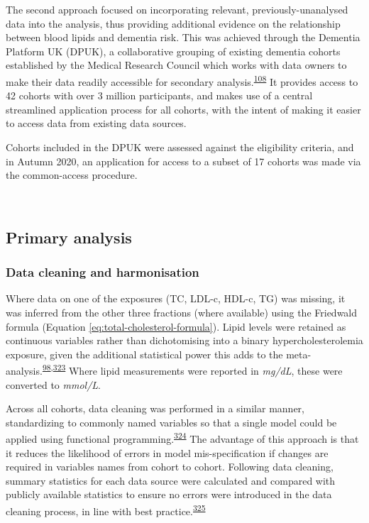 \documentclass[a4paper, twoside]{templates/ociamthesis}
\begin{document}
The second approach focused on incorporating relevant, previously-unanalysed data into the analysis, thus providing additional evidence on the relationship between blood lipids and dementia risk. This was achieved through the Dementia Platform UK (DPUK), a collaborative grouping of existing dementia cohorts established by the Medical Research Council which works with data owners to make their data readily accessible for secondary analysis.\textsuperscript{\protect\hyperlink{ref-bauermeister2020}{108}} It provides access to 42 cohorts with over 3 million participants, and makes use of a central streamlined application process for all cohorts, with the intent of making it easier to access data from existing data sources.

Cohorts included in the DPUK were assessed against the eligibility criteria, and in Autumn 2020, an application for access to a subset of 17 cohorts was made via the common-access procedure.

~

\hypertarget{primary-analysis-1}{%
\subsection{Primary analysis}\label{primary-analysis-1}}

\hypertarget{data-cleaning-and-harmonisation}{%
\subsubsection{Data cleaning and harmonisation}\label{data-cleaning-and-harmonisation}}

Where data on one of the exposures (TC, LDL-c, HDL-c, TG) was missing, it was inferred from the other three fractions (where available) using the Friedwald formula (Equation \eqref{eq:total-cholesterol-formula}). Lipid levels were retained as continuous variables rather than dichotomising into a binary hypercholesterolemia exposure, given the additional statistical power this adds to the meta-analysis.\textsuperscript{\protect\hyperlink{ref-riley2020}{98},\protect\hyperlink{ref-ensor2018}{323}} Where lipid measurements were reported in \emph{mg/dL}, these were converted to \emph{mmol/L}.

Across all cohorts, data cleaning was performed in a similar manner, standardizing to commonly named variables so that a single model could be applied using functional programming.\textsuperscript{\protect\hyperlink{ref-wickham2016func}{324}} The advantage of this approach is that it reduces the likelihood of errors in model mis-specification if changes are required in variables names from cohort to cohort. Following data cleaning, summary statistics for each data source were calculated and compared with publicly available statistics to ensure no errors were introduced in the data cleaning process, in line with best practice.\textsuperscript{\protect\hyperlink{ref-levis2021}{325}}
\end{document}
